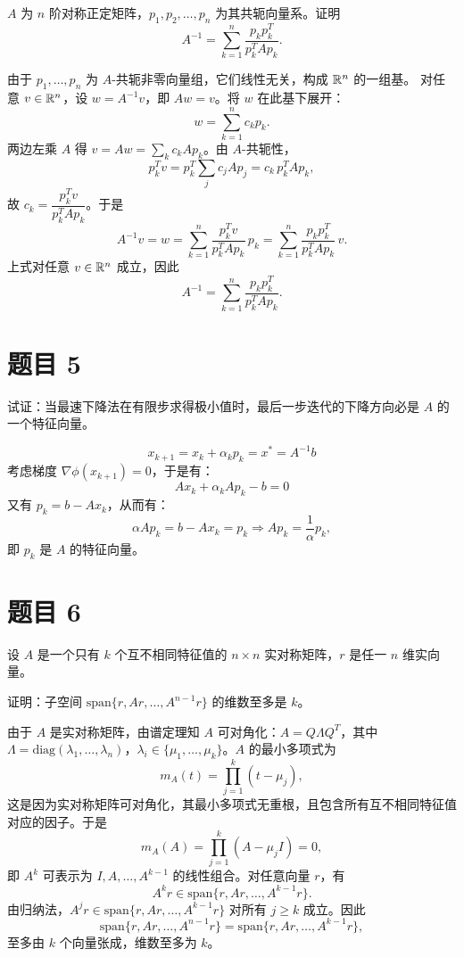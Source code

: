 \documentclass{article}
\begin{document}
$A$ 为 $n$ 阶对称正定矩阵，$p_1, p_2, \dots, p_n$ 为其共轭向量系。证明
\[
  A^{-1} = \sum_{k=1}^{n} \frac{p_k p_k^T}{p_k^T A p_k}.
\]

\begin{solution}
  由于 $p_1, \dots, p_n$ 为 $A$-共轭非零向量组，它们线性无关，构成 $\mathbb{R}^n$ 的一组基。
  对任意 $v \in \mathbb{R}^n$，设 $w = A^{-1}v$，即 $Aw = v$。将 $w$ 在此基下展开：
  \[
    w = \sum_{k=1}^n c_k p_k.
  \]
  两边左乘 $A$ 得 $v = Aw = \sum_k c_k Ap_k$。由 $A$-共轭性，
  \[
    p_k^T v = p_k^T \sum_j c_j Ap_j = c_k \, p_k^T Ap_k,
  \]
  故 $c_k = \dfrac{p_k^T v}{p_k^T A p_k}$。于是
  \[
    A^{-1}v = w = \sum_{k=1}^n \frac{p_k^T v}{p_k^T A p_k} \, p_k
    = \sum_{k=1}^n \frac{p_k p_k^T}{p_k^T A p_k} \, v.
  \]
  上式对任意 $v \in \mathbb{R}^n$ 成立，因此
  \[
    A^{-1} = \sum_{k=1}^n \frac{p_k p_k^T}{p_k^T A p_k}.
  \]
\end{solution}

\section{题目 5}

试证：当最速下降法在有限步求得极小值时，最后一步迭代的下降方向必是 $A$ 的一个特征向量。

\begin{solution}

  \[
    x_{k+1} = x_k + \alpha_{k}p_{k} = x^* = A^{-1} b
  \]
  考虑梯度 $\nabla \phi(x_{k+1}) = 0$，于是有：
  \[
    Ax_k+\alpha_k A p_k - b = 0
  \]
  又有 $p_k = b-Ax_k$，从而有：
  \[
    \alpha A p_k = b-Ax_k = p_k \Rightarrow A p_k = \frac{1}{\alpha} p_k,
  \]
  即 $p_k$ 是 $A$ 的特征向量。

\end{solution}

\section{题目 6}

设 $A$ 是一个只有 $k$ 个互不相同特征值的 $n \times n$ 实对称矩阵，$r$ 是任一 $n$ 维实向量。

证明：子空间 $\mathrm{span}\{r, Ar, \dots, A^{n-1}r\}$ 的维数至多是 $k$。

\begin{solution}
  由于 $A$ 是实对称矩阵，由谱定理知 $A$ 可对角化：$A = Q \Lambda Q^T$，其中
  $\Lambda = \mathrm{diag}(\lambda_1, \dots, \lambda_n)$，$\lambda_i \in
  \{\mu_1, \dots, \mu_k\}$。$A$ 的最小多项式为
  \[
    m_A(t) = \prod_{j=1}^k (t - \mu_j),
  \]
  这是因为实对称矩阵可对角化，其最小多项式无重根，且包含所有互不相同特征值对应的因子。于是
  \[
    m_A(A) = \prod_{j=1}^k (A - \mu_j I) = 0,
  \]
  即 $A^k$ 可表示为 $I, A, \dots, A^{k-1}$ 的线性组合。对任意向量 $r$，有
  \[
    A^k r \in \mathrm{span}\{r, Ar, \dots, A^{k-1}r\}.
  \]
  由归纳法，$A^j r \in \mathrm{span}\{r, Ar, \dots, A^{k-1}r\}$ 对所有 $j \geq k$ 成立。因此
  \[
    \mathrm{span}\{r, Ar, \dots, A^{n-1}r\} = \mathrm{span}\{r, Ar,
    \dots, A^{k-1}r\},
  \]
  至多由 $k$ 个向量张成，维数至多为 $k$。
\end{solution}
\end{document}
